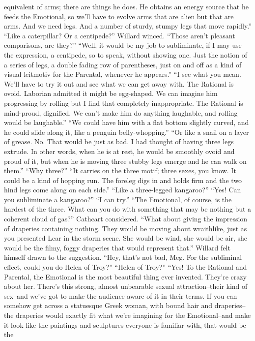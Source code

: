 \documentclass[a4paper,12pt]{article}
\begin{document}
equivalent of arms; there are things he does. He obtains an energy source that he feeds the Emotional, so
we’ll have to evolve arms that are alien but that are arms. And we need legs. And a number of sturdy,
stumpy legs that move rapidly.”
“Like a caterpillar? Or a centipede?”
Willard winced. “Those aren’t pleasant comparisons, are they?”
“Well, it would be my job to subliminate, if I may use the expression, a centipede, so to speak,
without showing one. Just the notion of a series of legs, a double fading row of parentheses, just on and off
as a kind of visual leitmotiv for the Parental, whenever he appears.”
“I see what you mean. We’ll have to try it out and see what we can get away with. The Rational is
ovoid. Laborian admitted it might be egg-shaped. We can imagine him progressing by rolling but I find that
completely inappropriate. The Rational is mind-proud, dignified. We can’t make him do anything
laughable, and rolling would be laughable.”
“We could have him with a flat bottom slightly curved, and he could slide along it, like a penguin
belly-whopping.”
“Or like a snail on a layer of grease. No. That would be just as bad. I had thought of having three
legs extrude. In other words, when he is at rest, he would be smoothly ovoid and proud of it, but when he is
moving three stubby legs emerge and he can walk on them.”
“Why three?”
“It carries on the three motif; three sexes, you know. It could be a kind of hopping run. The foreleg
digs in and holds firm and the two hind legs come along on each side.”
“Like a three-legged kangaroo?”
“Yes! Can you subliminate a kangaroo?”
“I can try.”
“The Emotional, of course, is the hardest of the three. What can you do with something that may
be nothing but a coherent cloud of gas?”
Cathcart considered. “What about giving the impression of draperies containing nothing. They
would be moving about wraithlike, just as you presented Lear in the storm scene. She would be wind, she
would be air, she would be the filmy, foggy draperies that would represent that.”
Willard felt himself drawn to the suggestion. “Hey, that’s not bad, Meg. For the subliminal effect,
could you do Helen of Troy?”
“Helen of Troy?”
“Yes! To the Rational and Parental, the Emotional is the most beautiful thing ever invented.
They’re crazy about her. There’s this strong, almost unbearable sexual attraction--their kind of sex--and
we’ve got to make the audience aware of it in their terms. If you can somehow get across a statuesque
Greek woman, with bound hair and draperies--the draperies would exactly fit what we’re imagining for the
Emotional--and make it look like the paintings and sculptures everyone is familiar with, that would be the
\end{document}
